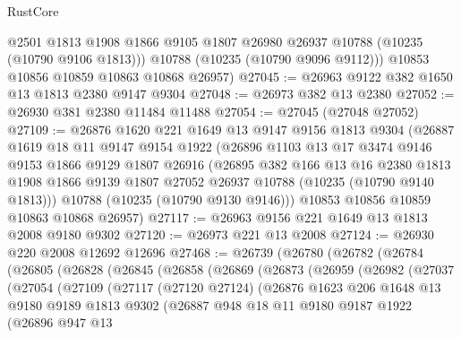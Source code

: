 \begin{lexlean}{RustCore}
\begin{coremodule}
          @2501
          @1813
          @1908
          @1866
          @9105
          @1807
          @26980
          @26937
          @10788
          (@10235 (@10790 @9106 @1813)))
        @10788
        (@10235 (@10790 @9096 @9112)))
      @10853
      @10856
      @10859
      @10863
      @10868
      @26957)
@27045 := @26963 @9122 @382 @1650 @13 @1813 @2380 @9147 @9304
@27048 := @26973 @382 @13 @2380
@27052 := @26930 @381 @2380 @11484 @11488
@27054 := @27045 (@27048 @27052)
@27109 := @26876
    @1620
    @221
    @1649
    @13
    @9147
    @9156
    @1813
    @9304
    (@26887
      @1619
      @18
      @11
      @9147
      @9154
      @1922
      (@26896
        @1103
        @13
        @17
        @3474
        @9146
        @9153
        @1866
        @9129
        @1807
        @26916
        (@26895
          @382
          @166
          @13
          @16
          @2380
          @1813
          @1908
          @1866
          @9139
          @1807
          @27052
          @26937
          @10788
          (@10235 (@10790 @9140 @1813)))
        @10788
        (@10235 (@10790 @9130 @9146)))
      @10853
      @10856
      @10859
      @10863
      @10868
      @26957)
@27117 := @26963 @9156 @221 @1649 @13 @1813 @2008 @9180 @9302
@27120 := @26973 @221 @13 @2008
@27124 := @26930 @220 @2008 @12692 @12696
@27468 := @26739
    (@26780
      (@26782
        (@26784
          (@26805
            (@26828
              (@26845
                (@26858
                  (@26869
                    (@26873
                      (@26959
                        (@26982
                          (@27037
                            (@27054
                              (@27109
                                (@27117
                                  (@27120 @27124)
                                  (@26876
                                    @1623
                                    @206
                                    @1648
                                    @13
                                    @9180
                                    @9189
                                    @1813
                                    @9302
                                    (@26887
                                      @948
                                      @18
                                      @11
                                      @9180
                                      @9187
                                      @1922
                                      (@26896
                                        @947
                                        @13

\end{coremodule}
\end{lexlean}
